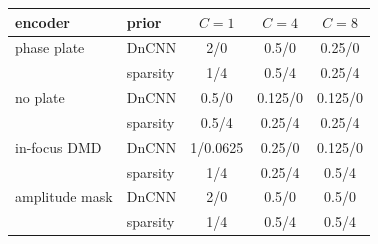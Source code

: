 \begin{tabular}{@{}ll ccc@{}}\toprule
encoder & prior & $C=1$ & $C=4$ & $C=8$\\\midrule
phase plate & DnCNN & 2/0 & 0.5/0 & 0.25/0\\
 & sparsity & 1/4 & 0.5/4 & 0.25/4\\
no plate & DnCNN & 0.5/0 & 0.125/0 & 0.125/0\\
 & sparsity & 0.5/4 & 0.25/4 & 0.25/4\\
in-focus DMD & DnCNN & 1/0.0625 & 0.25/0 & 0.125/0\\
 & sparsity & 1/4 & 0.25/4 & 0.5/4\\
amplitude mask & DnCNN & 2/0 & 0.5/0 & 0.5/0\\
 & sparsity & 1/4 & 0.5/4 & 0.5/4\\
\bottomrule\end{tabular}
